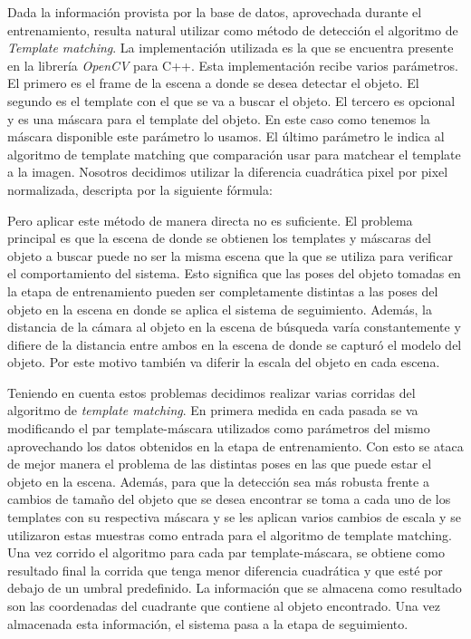 
Dada la información provista por la base de datos, aprovechada durante el entrenamiento, resulta natural utilizar como método de detección el algoritmo de \textit{Template matching}. La implementación utilizada es la que se encuentra presente en la librería \textit{OpenCV} para C++. Esta implementación recibe varios parámetros. El primero es el frame de la escena a donde se desea detectar el objeto. El segundo es el template con el que se va a buscar el objeto. El tercero es opcional y es una máscara para el template del objeto. En este caso como tenemos la máscara disponible este parámetro lo usamos. El último parámetro le indica al algoritmo de template matching que comparación usar para matchear el template a la imagen. Nosotros decidimos utilizar la diferencia cuadrática pixel por pixel normalizada, descripta por la siguiente fórmula:

Pero aplicar este método de manera directa no es suficiente. El problema principal es que la escena de donde se obtienen los templates y máscaras del objeto a buscar puede no ser la misma escena que la que se utiliza para verificar el comportamiento del sistema. Esto significa que las poses del objeto tomadas en la etapa de entrenamiento pueden ser completamente distintas a las poses del objeto en la escena en donde se aplica el sistema de seguimiento. Además, la distancia de la cámara al objeto en la escena de búsqueda varía constantemente y difiere de la distancia entre ambos en la escena de donde se capturó el modelo del objeto. Por este motivo también va diferir la escala del objeto en cada escena.

Teniendo en cuenta estos problemas decidimos realizar varias corridas del algoritmo de \textit{template matching}. En primera medida en cada pasada se va modificando el par template-máscara utilizados como parámetros del mismo aprovechando los datos obtenidos en la etapa de entrenamiento. Con esto se ataca de mejor manera el problema de las distintas poses en las que puede estar el objeto en la escena. Además, para que la detección sea más robusta frente a cambios de tamaño del objeto que se desea encontrar se toma a cada uno de los templates con su respectiva máscara y se les aplican varios cambios de escala y se utilizaron estas muestras como entrada para el algoritmo de template matching. Una vez corrido el algoritmo para cada par template-máscara, se obtiene como resultado final la corrida que tenga menor diferencia cuadrática y que esté por debajo de un umbral predefinido. La información que se almacena como resultado son las coordenadas del cuadrante que contiene al objeto encontrado. Una vez almacenada esta información, el sistema pasa a la etapa de seguimiento.

